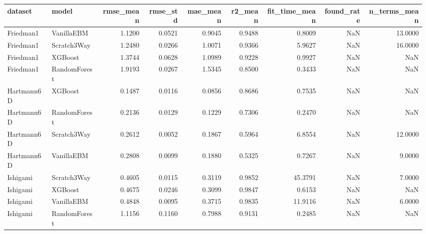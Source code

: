 \begin{tabular}{llrrrrrrr}
\toprule
dataset & model & rmse_mean & rmse_std & mae_mean & r2_mean & fit_time_mean & found_rate & n_terms_mean \\
\midrule
Friedman1 & VanillaEBM & 1.1200 & 0.0521 & 0.9045 & 0.9488 & 0.8009 & NaN & 13.0000 \\
Friedman1 & Scratch3Way & 1.2480 & 0.0266 & 1.0071 & 0.9366 & 5.9627 & NaN & 16.0000 \\
Friedman1 & XGBoost & 1.3744 & 0.0628 & 1.0989 & 0.9228 & 0.9927 & NaN & NaN \\
Friedman1 & RandomForest & 1.9193 & 0.0267 & 1.5345 & 0.8500 & 0.3433 & NaN & NaN \\
Hartmann6D & XGBoost & 0.1487 & 0.0116 & 0.0856 & 0.8686 & 0.7535 & NaN & NaN \\
Hartmann6D & RandomForest & 0.2136 & 0.0129 & 0.1229 & 0.7306 & 0.2470 & NaN & NaN \\
Hartmann6D & Scratch3Way & 0.2612 & 0.0052 & 0.1867 & 0.5964 & 6.8554 & NaN & 12.0000 \\
Hartmann6D & VanillaEBM & 0.2808 & 0.0099 & 0.1880 & 0.5325 & 0.7267 & NaN & 9.0000 \\
Ishigami & Scratch3Way & 0.4605 & 0.0115 & 0.3119 & 0.9852 & 45.3791 & NaN & 7.0000 \\
Ishigami & XGBoost & 0.4675 & 0.0246 & 0.3099 & 0.9847 & 0.6153 & NaN & NaN \\
Ishigami & VanillaEBM & 0.4848 & 0.0095 & 0.3715 & 0.9835 & 11.9116 & NaN & 6.0000 \\
Ishigami & RandomForest & 1.1156 & 0.1160 & 0.7988 & 0.9131 & 0.2485 & NaN & NaN \\
\bottomrule
\end{tabular}
